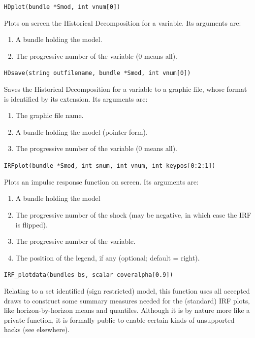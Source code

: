 \documentclass[a4paper,10pt]{article}
\newenvironment{funcdoc}[1]
{\noindent\hrulefill\newline\nopagebreak\texttt{#1}%
\nopagebreak\par\noindent\hrulefill%
\nopagebreak\par\nopagebreak\smallskip\nopagebreak\par}
{\bigskip}
\begin{document}
\begin{funcdoc}{HDplot(bundle *Smod, int vnum[0])}
  Plots on screen the Historical Decomposition for a variable. Its
  arguments are:
  \begin{enumerate}
  \item A bundle holding the model.
  \item The progressive number of the variable (0 means all).
  \end{enumerate}
\end{funcdoc}

\begin{funcdoc}{HDsave(string outfilename, bundle *Smod, int vnum[0])}
  Saves the Historical Decomposition for a variable to a graphic file,
  whose format is identified by its extension. Its arguments are:
  \begin{enumerate}
  \item The graphic file name.
  \item A bundle holding the model (pointer form).
  \item The progressive number of the variable (0 means all).
  \end{enumerate}
\end{funcdoc}

\begin{funcdoc}{IRFplot(bundle *Smod, int snum, int vnum, int keypos[0:2:1])}
  Plots an impulse response function on screen. Its arguments are:
  \begin{enumerate}
  \item A bundle holding the model
  \item The progressive number of the shock (may be negative, in which
    case the IRF is flipped).
  \item The progressive number of the variable.
  \item The position of the legend, if any (optional; default = right).
  \end{enumerate}
\end{funcdoc}

\begin{funcdoc}{IRF\_plotdata(bundles bs, scalar coveralpha[0.9])}
 [Function name and usage subject to change.]
 Relating to a set identified (sign restricted) model, this function uses 
 all accepted draws to construct some summary measures needed for the 
 (standard) IRF plots, like horizon-by-horizon means and quantiles.
 Although it is by nature more like a private function, it is formally public to 
 enable certain kinds of unsupported hacks (see elsewhere).
\end{funcdoc}
\end{document}
